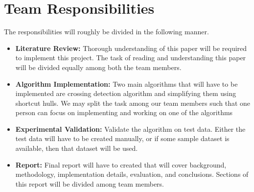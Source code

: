 \documentclass[11pt,a4paper]{article}
\begin{document}
\section {Team Responsibilities}
The responsibilities will roughly be divided in the following manner.
\begin{itemize}[leftmargin=*,noitemsep]
    \item \textbf{Literature Review:} 
        Thorough understanding of this paper will be required to implement this project. The task of reading and understanding this paper will be divided equally among both the team members.
    \item \textbf{Algorithm Implementation:}
        Two main algorithms that will have to be implemented are crossing detection algorithm and simplifying them using shortcut hulls. We may split the task among our team members such that one person can focus on implementing and working on one of the algorithms
    \item \textbf{Experimental Validation:}
        Validate the algorithm on test data. Either the test data will have to be created manually, or if some sample dataset is available, then that dataset will be used.
    \item \textbf{Report:}
        Final report will have to created that will cover background, methodology, implementation details, evaluation, and conclusions. Sections of this report will be divided among team members.
\end{itemize}
\end{document}
